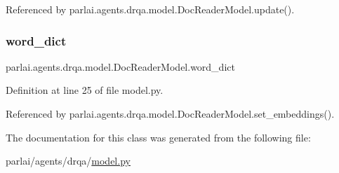 Referenced by parlai.\+agents.\+drqa.\+model.\+Doc\+Reader\+Model.\+update().

\mbox{\label{classparlai_1_1agents_1_1drqa_1_1model_1_1DocReaderModel_a2c53c78892ade8ebd82cb581608d58dd}} 
\subsubsection{\texorpdfstring{word\+\_\+dict}{word\_dict}}
{\footnotesize\ttfamily parlai.\+agents.\+drqa.\+model.\+Doc\+Reader\+Model.\+word\+\_\+dict}



Definition at line 25 of file model.\+py.



Referenced by parlai.\+agents.\+drqa.\+model.\+Doc\+Reader\+Model.\+set\+\_\+embeddings().



The documentation for this class was generated from the following file\+:\begin{DoxyCompactItemize}
\item 
parlai/agents/drqa/\hyperlink{model_8py}{model.\+py}\end{DoxyCompactItemize}
